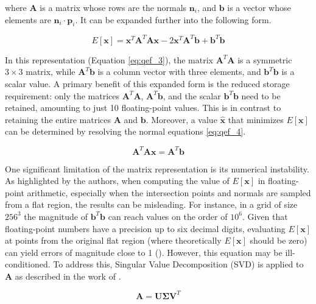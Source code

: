 \noindent where \( \mathbf{A} \) is a matrix whose rows are the normals \( \mathbf{n}_i \), and \( \mathbf{b} \) is a vector whose elements are \( \mathbf{n}_i \cdot \mathbf{p}_i \). It can be expanded further into the following form.

\begin{equation}
E[\mathbf{x}] = \mathbf{x}^T \mathbf{A}^T \mathbf{A} \mathbf{x} - 2 \mathbf{x}^T \mathbf{A}^T \mathbf{b} + \mathbf{b}^T \mathbf{b}
\label{eq:qef_3}
\end{equation}

\noindent In this representation (Equation \ref{eq:qef_3}), the matrix \( \mathbf{A}^T \mathbf{A} \) is a symmetric \( 3 \times 3 \) matrix, while \( \mathbf{A}^T \mathbf{b} \) is a column vector with three elements, and \( \mathbf{b}^T \mathbf{b} \) is a scalar value. A primary benefit of this expanded form is the reduced storage requirement: only the matrices \( \mathbf{A}^T \mathbf{A} \), \( \mathbf{A}^T \mathbf{b} \), and the scalar \( \mathbf{b}^T \mathbf{b} \) need to be retained, amounting to just 10 floating-point values. This is in contrast to retaining the entire matrices \( \mathbf{A} \) and \( \mathbf{b} \). Moreover, a value \( \hat{\mathbf{x}} \) that minimizes \( E[\mathbf{x}] \) can be determined by resolving the normal equations \ref{eq:qef_4}.

\begin{equation}
\mathbf{A}^T \mathbf{A} \mathbf{x} = \mathbf{A}^T \mathbf{b}
\label{eq:qef_4}
\end{equation}

\noindent One significant limitation of the matrix representation is its numerical instability. As highlighted by the authors, when computing the value of \( E[\mathbf{x}] \) in floating-point arithmetic, especially when the intersection points and normals are sampled from a flat region, the results can be misleading. For instance, in a grid of size \( 256^3 \) the magnitude of \( \mathbf{b}^T \mathbf{b} \) can reach values on the order of \( 10^6 \). Given that floating-point numbers have a precision up to six decimal digits, evaluating \( E[\mathbf{x}] \) at points from the original flat region (where theoretically \( E[\mathbf{x}] \) should be zero) can yield errors of magnitude close to 1 (\cite{Ju_2002}). However, this equation may be ill-conditioned. To address this, Singular Value Decomposition (SVD) is applied to \( \mathbf{A} \) as described in the work of \cite{Press_2007}.

\begin{equation}
\mathbf{A} = \mathbf{U} \mathbf{\Sigma} \mathbf{V}^T
\end{equation}


